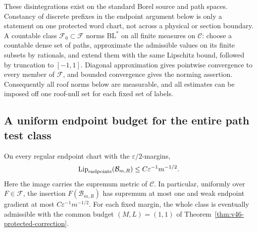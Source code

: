 These disintegrations exist on the standard Borel source and path
spaces. Constancy of discrete prefixes in the endpoint argument below
is only a statement on one protected word chart, not across a physical
or section boundary. A countable class $\mathcal F_0\subset\mathcal F$ norms
$\mathrm{BL}^*$ on all finite measures on $\mathcal C$: choose a
countable dense set of paths, approximate the admissible values on
its finite subsets by rationals, and extend them with the same
Lipschitz bound, followed by truncation to $[-1,1]$. Diagonal
approximation gives pointwise convergence to every member of
$\mathcal F$, and bounded convergence gives the norming assertion.
Consequently all roof norms below are measurable, and all estimates
can be imposed off one roof-null set for each fixed set of labels.

\subsection{A uniform endpoint budget for the entire path test class}
\begin{lemma}
\label{lem:v52-path-endpoint-budget}
On every regular endpoint chart with the $\varepsilon/2$-margins,
\begin{equation}\label{eq:v52-path-endpoint-budget}
 \operatorname{Lip}_{\rm endpoints}(\mathcal B_{m,R})
                    \le C\varepsilon^{-1}m^{-1/2}.
\end{equation}
Here the image carries the supremum metric of $\mathcal C$.
In particular, uniformly over $F\in\mathcal F$, the insertion
$F(\mathcal B_{m,R})$ has supremum at most one and weak endpoint
gradient at most $C\varepsilon^{-1}m^{-1/2}$.
For each fixed margin, the whole class is eventually admissible
with the common budget $(M,L)=(1,1)$ of
Theorem~\ref{thm:v46-protected-correction}.
\end{lemma}
